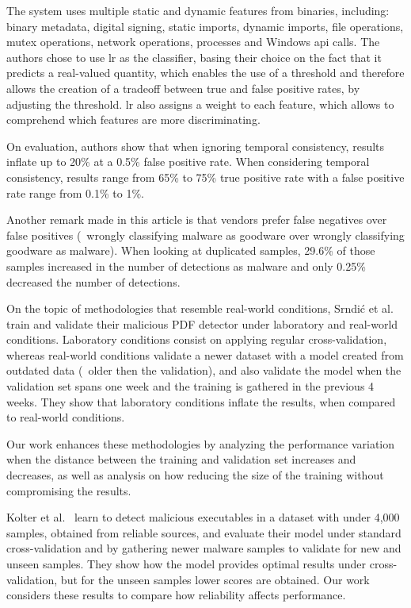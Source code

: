 The system uses multiple static and dynamic features from binaries, including: binary metadata, digital signing, static imports, dynamic imports, file operations, mutex operations, network operations, processes and Windows \gls{api} calls.
The authors chose to use \acrfull{lr} as the classifier, basing their choice on the fact that it predicts a real-valued quantity, which enables the use of a threshold and therefore allows the creation of a tradeoff between true and false positive rates, by adjusting the threshold.
\gls{lr} also assigns a weight to each feature, which allows to comprehend which features are more discriminating.

On evaluation, authors show that when ignoring temporal consistency, results inflate up to 20\% at a 0.5\% false positive rate.
When considering temporal consistency, results range from 65\% to 75\% true positive rate with a false positive rate range from 0.1\% to 1\%.

Another remark made in this article is that vendors prefer false negatives over false positives (\ie\ wrongly classifying malware as goodware over wrongly classifying goodware as malware).
When looking at duplicated samples, 29.6\% of those samples increased in the number of detections as malware and only 0.25\% decreased the number of detections.

\medskip

On the topic of methodologies that resemble real-world conditions, Srndi\'c et al.~\cite{vsrndic2013detection} train and validate their malicious PDF detector under laboratory and real-world conditions.
Laboratory conditions consist on applying regular cross-validation, whereas real-world conditions validate a newer dataset with a model created from outdated data (\ie\ older then the validation), and also validate the model when the validation set spans one week and the training is gathered in the previous 4 weeks.
They show that laboratory conditions inflate the results, when compared to real-world conditions.

Our work enhances these methodologies by analyzing the performance variation when the distance between the training and validation set increases and decreases, as well as analysis on how reducing the size of the training without compromising the results.

\medskip

Kolter et al.~\cite{kolter:learning} learn to detect malicious executables in a dataset with under 4,000 samples, obtained from reliable sources, and evaluate their model under standard cross-validation and by gathering newer malware samples to validate for new and unseen samples.
They show how the model provides optimal results under cross-validation, but for the unseen samples lower scores are obtained.
Our work considers these results to compare how reliability affects performance.

